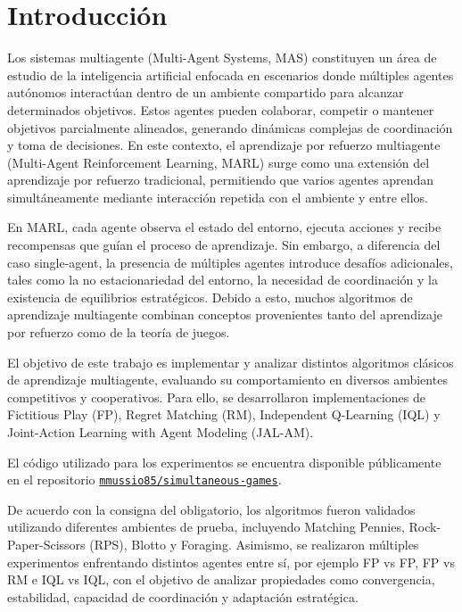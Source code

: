 \documentclass[letterpaper,12pt]{article} %
\begin{document}
    
    \newpage
    \tableofcontents
    \newpage


\section{Introducción}

Los sistemas multiagente (Multi-Agent Systems, MAS) constituyen un área de estudio de la inteligencia artificial enfocada en escenarios donde múltiples agentes autónomos interactúan dentro de un ambiente compartido para alcanzar determinados objetivos. Estos agentes pueden colaborar, competir o mantener objetivos parcialmente alineados, generando dinámicas complejas de coordinación y toma de decisiones. En este contexto, el aprendizaje por refuerzo multiagente (Multi-Agent Reinforcement Learning, MARL) surge como una extensión del aprendizaje por refuerzo tradicional, permitiendo que varios agentes aprendan simultáneamente mediante interacción repetida con el ambiente y entre ellos.

En MARL, cada agente observa el estado del entorno, ejecuta acciones y recibe recompensas que guían el proceso de aprendizaje. Sin embargo, a diferencia del caso single-agent, la presencia de múltiples agentes introduce desafíos adicionales, tales como la no estacionariedad del entorno, la necesidad de coordinación y la existencia de equilibrios estratégicos. Debido a esto, muchos algoritmos de aprendizaje multiagente combinan conceptos provenientes tanto del aprendizaje por refuerzo como de la teoría de juegos.

El objetivo de este trabajo es implementar y analizar distintos algoritmos clásicos de aprendizaje multiagente, evaluando su comportamiento en diversos ambientes competitivos y cooperativos. Para ello, se desarrollaron implementaciones de Fictitious Play (FP), Regret Matching (RM), Independent Q-Learning (IQL) y Joint-Action Learning with Agent Modeling (JAL-AM).

El código utilizado para los experimentos se encuentra disponible públicamente en el repositorio \href{https://github.com/mmussio85/simultaneous-games}{\texttt{mmussio85/simultaneous-games}}.

De acuerdo con la consigna del obligatorio, los algoritmos fueron validados utilizando diferentes ambientes de prueba, incluyendo Matching Pennies, Rock-Paper-Scissors (RPS), Blotto y Foraging. Asimismo, se realizaron múltiples experimentos enfrentando distintos agentes entre sí, por ejemplo FP vs FP, FP vs RM e IQL vs IQL, con el objetivo de analizar propiedades como convergencia, estabilidad, capacidad de coordinación y adaptación estratégica.
\end{document}
